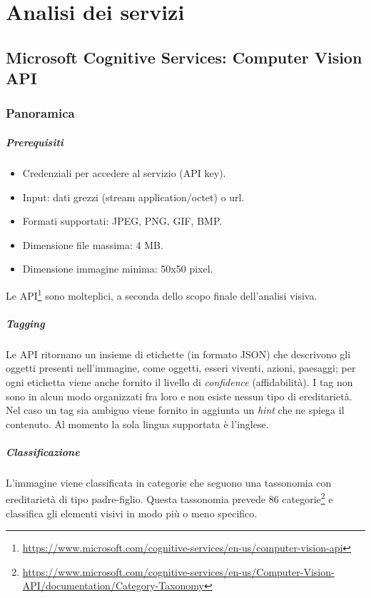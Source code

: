 \documentclass[fleqn,a4paper,11pt]{report}
\begin{document}
{\let\clearpage\relax \chapter{Analisi dei servizi}}
\section{Microsoft Cognitive Services: Computer Vision API}
\subsection{Panoramica}
\paragraph{Prerequisiti}
\begin{itemize}
\item Credenziali per accedere al servizio (API key).
\item Input: dati grezzi (stream application/octet) o url.
\item Formati supportati: JPEG, PNG, GIF, BMP.
\item Dimensione file massima: 4 MB.
\item Dimensione immagine minima: 50x50 pixel.
\end{itemize}
%

Le API\footnote{\url{https://www.microsoft.com/cognitive-services/en-us/computer-vision-api}} sono molteplici, a seconda dello scopo finale dell'analisi visiva.

\paragraph{Tagging} Le API ritornano un insieme di etichette (in formato JSON) che descrivono gli oggetti presenti nell'immagine, come oggetti, esseri viventi, azioni, paesaggi; per ogni etichetta viene anche fornito il livello di \textit{confidence} (affidabilità). I tag non sono in alcun modo organizzati fra loro e non esiste nessun tipo di ereditarietà.
Nel caso un tag sia ambiguo viene fornito in aggiunta un \textit{hint} che ne spiega il contenuto.
Al momento la sola lingua supportata è l'inglese.

\paragraph{Classificazione} L'immagine viene classificata in categorie che seguono una tassonomia con ereditarietà di tipo padre-figlio. Questa tassonomia prevede 86 categorie\footnote{\url{https://www.microsoft.com/cognitive-services/en-us/Computer-Vision-API/documentation/Category-Taxonomy}} e classifica gli elementi visivi in modo più o meno specifico.
\end{document}
